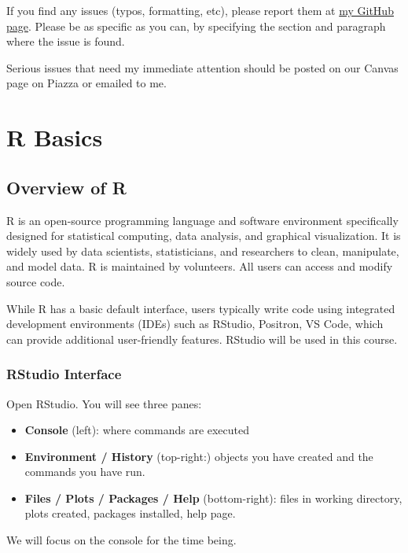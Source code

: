 \documentclass[
]{book}
\providecommand{\tightlist}{%
  \setlength{\itemsep}{0pt}\setlength{\parskip}{0pt}}
\theoremstyle{definition}
\theoremstyle{definition}
\theoremstyle{definition}
\theoremstyle{definition}
\theoremstyle{remark}
\begin{document}
If you find any issues (typos, formatting, etc), please report them at \href{https://github.com/jwooSDS/stat3080/issues}{my GitHub page}. Please be as specific as you can, by specifying the section and paragraph where the issue is found.

Serious issues that need my immediate attention should be posted on our Canvas page on Piazza or emailed to me.

\hypertarget{Rbasics}{%
\chapter{R Basics}\label{Rbasics}}

\hypertarget{overview-of-r}{%
\section{Overview of R}\label{overview-of-r}}

R is an open-source programming language and software environment specifically designed for statistical computing, data analysis, and graphical visualization. It is widely used by data scientists, statisticians, and researchers to clean, manipulate, and model data. R is maintained by volunteers. All users can access and modify source code.

While R has a basic default interface, users typically write code using integrated development environments (IDEs) such as RStudio, Positron, VS Code, which can provide additional user-friendly features. RStudio will be used in this course.

\hypertarget{rstudio-interface}{%
\subsection{RStudio Interface}\label{rstudio-interface}}

Open RStudio. You will see three panes:

\begin{itemize}
\tightlist
\item
  \textbf{Console} (left): where commands are executed
\item
  \textbf{Environment / History} (top-right:) objects you have created and the commands you have run.
\item
  \textbf{Files / Plots / Packages / Help} (bottom-right): files in working directory, plots created, packages installed, help page.
\end{itemize}

We will focus on the console for the time being.
\end{document}
